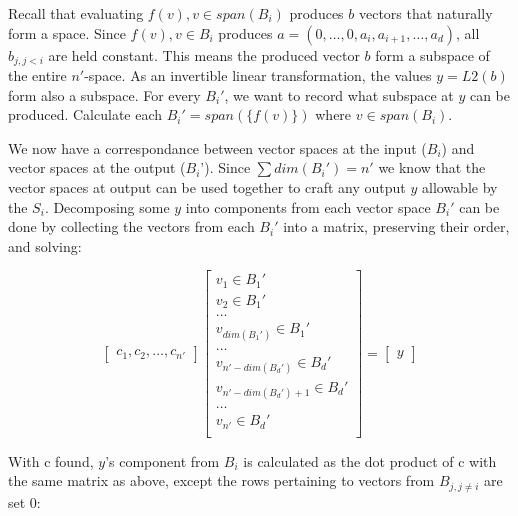 \documentclass{article}
\begin{document}
Recall that evaluating $f(v), v\in span(B_i)$ produces $b$ vectors that naturally form a space.
Since $f(v), v\in B_i$ produces $a = (0, \ldots, 0, a_i, a_{i+1}, \ldots, a_d)$, all $b_{j, j<i}$ are held constant.
This means the produced vector $b$ form a subspace of the entire $n'$-space.
As an invertible linear transformation, the values $y = L2(b)$ form also a subspace.
For every $B_i'$, we want to record what subspace at $y$ can be produced.
Calculate each $B_{i}' = span(\{f(v)\})$ where $v \in span(B_{i})$. 

We now have a correspondance between vector spaces at the input ($B_i$) and vector spaces at the output ($B_i$').
Since $\sum{dim(B_{i}')} = n'$ we know that the vector spaces at output can be used together to craft any output $y$ allowable by the $S_i$.
Decomposing some $y$ into components from each vector space $B_{i}'$ can be done by collecting the vectors from 
each $B_{i}'$ into a matrix, preserving their order, and solving:

\begin{equation*}
\begin{bmatrix}
c_1, c_2, \ldots, c_{n'}
\end{bmatrix}
\begin{bmatrix}
v_1 \in B_1' \\
v_2 \in B_1' \\
\ldots \\
v_{dim(B_1')} \in B_1' \\
\ldots \\
v_{n'-dim(B_d')} \in B_d' \\
v_{n'-dim(B_d')+1} \in B_d' \\
\ldots \\
v_{n'} \in B_d' \\
\end{bmatrix}
=
\begin{bmatrix}
y
\end{bmatrix}
\end{equation*}

With c found, $y$'s component from $B_i$ is calculated as the dot product of c with the same matrix as above, except the rows pertaining
to vectors from $B_{j, j\neq i}$ are set 0:
\end{document}
